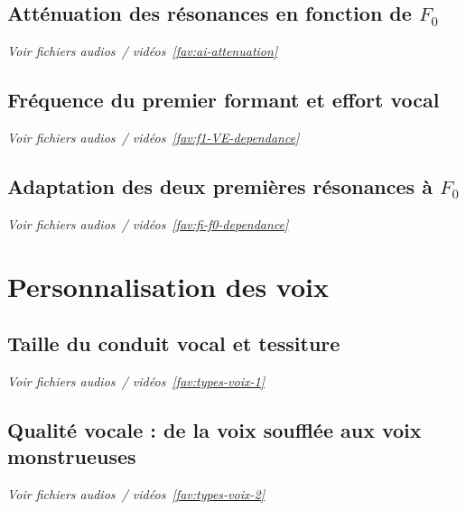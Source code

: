 \lipsum[1-1]


\subsection{Atténuation des résonances en fonction de $F_0$}
\label{sec:cantor-ai-attenuation}
\noindent \textit{Voir fichiers audios~/ vidéos~\ref{fav:ai-attenuation}}\\

\lipsum[1-2]

\subsection{Fréquence du premier formant et effort vocal}
\label{sec:cantor-f1f0}
\noindent \textit{Voir fichiers audios~/ vidéos~\ref{fav:f1-VE-dependance}}\\
\lipsum[1-1]

\subsection{Adaptation des deux premières résonances à $F_0$}
\label{Sec:Fi_F0}
\noindent \textit{Voir fichiers audios~/ vidéos~\ref{fav:fi-f0-dependance}}\\

\lipsum[1-2]



\section{Personnalisation des voix}
\label{Sec:personalisation_voix}



\subsection{Taille du conduit vocal et tessiture}
\label{Sec:tailleConduit}
\noindent \textit{Voir fichiers audios~/ vidéos~\ref{fav:types-voix-1}}\\

\lipsum[1-1]



\subsection{Qualité vocale : de la voix soufflée aux voix monstrueuses}
\label{sec:cantor-voixMonstres}
\noindent \textit{Voir fichiers audios~/ vidéos~\ref{fav:types-voix-2}}\\

